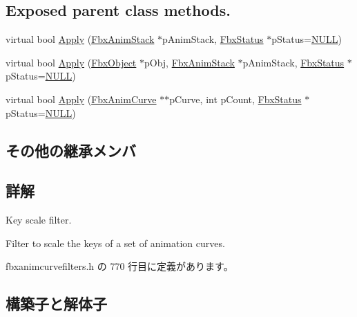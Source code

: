 \subsection*{Exposed parent class methods.}
\begin{DoxyCompactItemize}
\item 
virtual bool \hyperlink{class_fbx_anim_curve_filter_scale_ac6fb7610299bd0fc1e399418f8d17b90}{Apply} (\hyperlink{class_fbx_anim_stack}{Fbx\+Anim\+Stack} $\ast$p\+Anim\+Stack, \hyperlink{class_fbx_status}{Fbx\+Status} $\ast$p\+Status=\hyperlink{fbxarch_8h_a070d2ce7b6bb7e5c05602aa8c308d0c4}{N\+U\+LL})
\item 
virtual bool \hyperlink{class_fbx_anim_curve_filter_scale_acaecc7335471ad618e0cc7e02625dbec}{Apply} (\hyperlink{class_fbx_object}{Fbx\+Object} $\ast$p\+Obj, \hyperlink{class_fbx_anim_stack}{Fbx\+Anim\+Stack} $\ast$p\+Anim\+Stack, \hyperlink{class_fbx_status}{Fbx\+Status} $\ast$p\+Status=\hyperlink{fbxarch_8h_a070d2ce7b6bb7e5c05602aa8c308d0c4}{N\+U\+LL})
\item 
virtual bool \hyperlink{class_fbx_anim_curve_filter_scale_a2bf27f4195e038cd2d6308a3399ab556}{Apply} (\hyperlink{class_fbx_anim_curve}{Fbx\+Anim\+Curve} $\ast$$\ast$p\+Curve, int p\+Count, \hyperlink{class_fbx_status}{Fbx\+Status} $\ast$p\+Status=\hyperlink{fbxarch_8h_a070d2ce7b6bb7e5c05602aa8c308d0c4}{N\+U\+LL})
\end{DoxyCompactItemize}
\subsection*{その他の継承メンバ}


\subsection{詳解}
Key scale filter.

Filter to scale the keys of a set of animation curves. 

 fbxanimcurvefilters.\+h の 770 行目に定義があります。



\subsection{構築子と解体子}
\mbox{\label{class_fbx_anim_curve_filter_scale_a8ac5600b1b34f191cb4cab040d9d2ef9}} 
